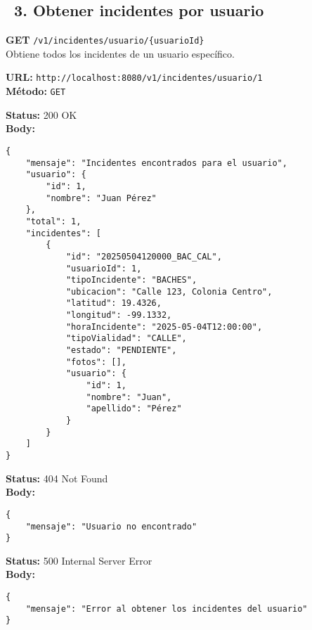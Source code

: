 \subsection*{\faServer\ 3. Obtener incidentes por usuario}
\begin{tcolorbox}[endpoint]
    \textbf{GET} \texttt{/v1/incidentes/usuario/\{usuarioId\}}\\
    Obtiene todos los incidentes de un usuario específico.
\end{tcolorbox}

\begin{tcolorbox}[request]
    \textbf{URL:} \textcolor{urlColor}{\texttt{http://localhost:8080/v1/incidentes/usuario/1}}\\
    \textbf{Método:} \textcolor{methodColor}{\texttt{GET}}
\end{tcolorbox}

\begin{tcolorbox}[response]
    \textbf{Status:} 200 OK\\
    \textbf{Body:}
    \begin{verbatim}
{
    "mensaje": "Incidentes encontrados para el usuario",
    "usuario": {
        "id": 1,
        "nombre": "Juan Pérez"
    },
    "total": 1,
    "incidentes": [
        {
            "id": "20250504120000_BAC_CAL",
            "usuarioId": 1,
            "tipoIncidente": "BACHES",
            "ubicacion": "Calle 123, Colonia Centro",
            "latitud": 19.4326,
            "longitud": -99.1332,
            "horaIncidente": "2025-05-04T12:00:00",
            "tipoVialidad": "CALLE",
            "estado": "PENDIENTE",
            "fotos": [],
            "usuario": {
                "id": 1,
                "nombre": "Juan",
                "apellido": "Pérez"
            }
        }
    ]
}
    \end{verbatim}
\end{tcolorbox}

\begin{tcolorbox}[response]
    \textbf{Status:} 404 Not Found\\
    \textbf{Body:}
    \begin{verbatim}
{
    "mensaje": "Usuario no encontrado"
}
    \end{verbatim}
\end{tcolorbox}

\begin{tcolorbox}[response]
    \textbf{Status:} 500 Internal Server Error\\
    \textbf{Body:}
    \begin{verbatim}
{
    "mensaje": "Error al obtener los incidentes del usuario"
}
    \end{verbatim}
\end{tcolorbox}

